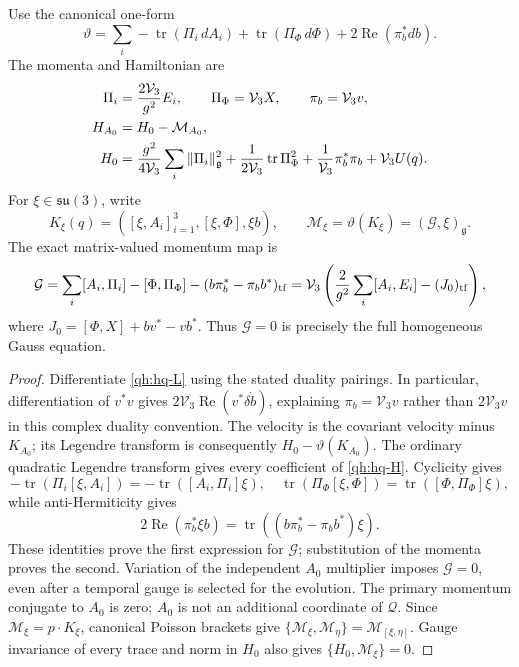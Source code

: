 \begin{proposition}
\label{qh:hq-canonical}
Use the canonical one-form
\[
 \vartheta=\sum_i-\operatorname{tr}(\Pi_i\,dA_i)
       +\operatorname{tr}(\Pi_\Phi\,d\Phi)
       +2\operatorname{Re}(\pi_b^*db).
\]
The momenta and Hamiltonian are
\begin{align}
 \Pi_i&=\frac{2\mathcal V_3}{g^2}E_i,\qquad
 \Pi_\Phi=\mathcal V_3X,\qquad \pi_b=\mathcal V_3v,\notag\\
 H_{A_0}&=H_0-\mathcal M_{A_0},\label{qh:hq-H}\\
 H_0&=\frac{g^2}{4\mathcal V_3}\sum_i\|\Pi_i\|_{\mathfrak g}^2
       +\frac1{2\mathcal V_3}\operatorname{tr}\Pi_\Phi^2
       +\frac1{\mathcal V_3}\pi_b^*\pi_b+\mathcal V_3U(q).\notag
\end{align}
For \(\xi\in\mathfrak{su}(3)\), write
\[
 K_\xi(q)=([\xi,A_i]_{i=1}^3,[\xi,\Phi],\xi b),\qquad
 \mathcal M_\xi=\vartheta(K_\xi)=(\mathcal G,\xi)_{\mathfrak g}.
\]
The exact matrix-valued momentum map is
\begin{equation}\label{qh:hq-Gauss}
 \mathcal G=\sum_i[A_i,\Pi_i]-[\Phi,\Pi_\Phi]
          -(b\pi_b^*-\pi_b b^*)_{\rm tf}
 =\mathcal V_3\left(\frac2{g^2}\sum_i[A_i,E_i]-(J_0)_{\rm tf}\right),
\end{equation}
where \(J_0=[\Phi,X]+bv^*-vb^*\).
Thus \(\mathcal G=0\) is precisely the full homogeneous Gauss equation.
\end{proposition}
\begin{proof}
Differentiate \eqref{qh:hq-L} using the stated duality pairings.
In particular, differentiation of \(v^*v\) gives
\(2\mathcal V_3\operatorname{Re}(v^*\delta\dot b)\), explaining
\(\pi_b=\mathcal V_3v\) rather than \(2\mathcal V_3v\) in this complex
duality convention. The velocity is the covariant velocity minus
\(K_{A_0}\); its Legendre transform is consequently \(H_0-\vartheta(K_{A_0})\).
The ordinary quadratic Legendre transform gives every coefficient of
\eqref{qh:hq-H}. Cyclicity gives
\[
 -\operatorname{tr}(\Pi_i[\xi,A_i])
       =-\operatorname{tr}([A_i,\Pi_i]\xi),\quad
 \operatorname{tr}(\Pi_\Phi[\xi,\Phi])
       =\operatorname{tr}([\Phi,\Pi_\Phi]\xi),
\]
while anti-Hermiticity gives
\[
 2\operatorname{Re}(\pi_b^*\xi b)
       =\operatorname{tr}((b\pi_b^*-\pi_b b^*)\xi).
\]
These identities prove the first expression for \(\mathcal G\);
substitution of the momenta proves the second. Variation of the
independent \(A_0\) multiplier imposes \(\mathcal G=0\), even after a
temporal gauge is selected for the evolution. The primary momentum
conjugate to \(A_0\) is zero; \(A_0\) is not an additional coordinate
of \(\mathcal Q\). Since \(\mathcal M_\xi=p\cdot K_\xi\), canonical
Poisson brackets give
\(\{\mathcal M_\xi,\mathcal M_\eta\}=\mathcal M_{[\xi,\eta]}\).
Gauge invariance of every trace and norm in \(H_0\) also gives
\(\{H_0,\mathcal M_\xi\}=0\).
\end{proof}

